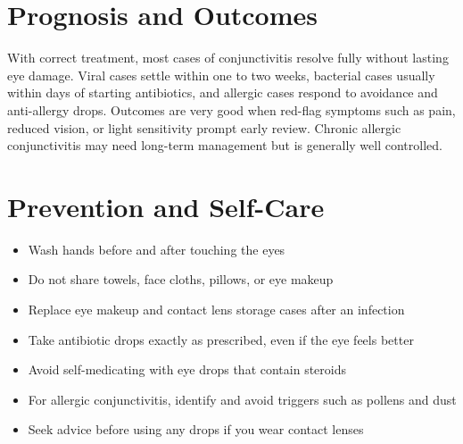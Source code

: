 \section*{Prognosis and Outcomes}
With correct treatment, most cases of conjunctivitis resolve fully without lasting eye damage. Viral cases settle within one to two weeks, bacterial cases usually within days of starting antibiotics, and allergic cases respond to avoidance and anti-allergy drops. Outcomes are very good when red-flag symptoms such as pain, reduced vision, or light sensitivity prompt early review. Chronic allergic conjunctivitis may need long-term management but is generally well controlled.

\section*{Prevention and Self-Care}
\begin{itemize}
    \item Wash hands before and after touching the eyes
    \item Do not share towels, face cloths, pillows, or eye makeup
    \item Replace eye makeup and contact lens storage cases after an infection
    \item Take antibiotic drops exactly as prescribed, even if the eye feels better
    \item Avoid self-medicating with eye drops that contain steroids
    \item For allergic conjunctivitis, identify and avoid triggers such as pollens and dust
    \item Seek advice before using any drops if you wear contact lenses
\end{itemize}

